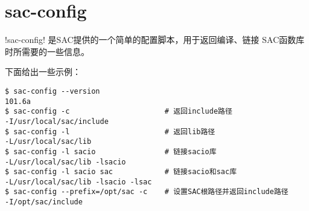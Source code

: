 \section{sac-config}
\label{sec:sac-config}

!sac-config! 是SAC提供的一个简单的配置脚本，用于返回编译、链接
SAC函数库时所需要的一些信息。

下面给出一些示例：
\begin{verbatim}
$ sac-config --version
101.6a
$ sac-config -c                      # 返回include路径
-I/usr/local/sac/include
$ sac-config -l                      # 返回lib路径
-L/usr/local/sac/lib
$ sac-config -l sacio                # 链接sacio库
-L/usr/local/sac/lib -lsacio
$ sac-config -l sacio sac            # 链接sacio和sac库
-L/usr/local/sac/lib -lsacio -lsac
$ sac-config --prefix=/opt/sac -c    # 设置SAC根路径并返回include路径
-I/opt/sac/include
\end{verbatim}
